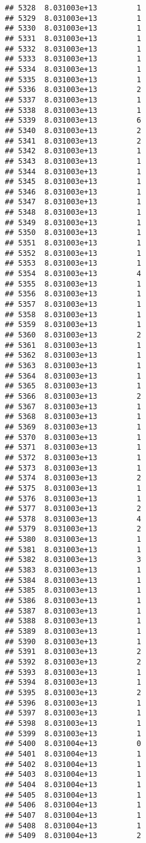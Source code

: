 \documentclass[
]{article}
\begin{document}
\begin{verbatim}
## 5328  8.031003e+13         1
## 5329  8.031003e+13         1
## 5330  8.031003e+13         1
## 5331  8.031003e+13         1
## 5332  8.031003e+13         1
## 5333  8.031003e+13         1
## 5334  8.031003e+13         1
## 5335  8.031003e+13         1
## 5336  8.031003e+13         2
## 5337  8.031003e+13         1
## 5338  8.031003e+13         1
## 5339  8.031003e+13         6
## 5340  8.031003e+13         2
## 5341  8.031003e+13         2
## 5342  8.031003e+13         1
## 5343  8.031003e+13         1
## 5344  8.031003e+13         1
## 5345  8.031003e+13         1
## 5346  8.031003e+13         1
## 5347  8.031003e+13         1
## 5348  8.031003e+13         1
## 5349  8.031003e+13         1
## 5350  8.031003e+13         1
## 5351  8.031003e+13         1
## 5352  8.031003e+13         1
## 5353  8.031003e+13         1
## 5354  8.031003e+13         4
## 5355  8.031003e+13         1
## 5356  8.031003e+13         1
## 5357  8.031003e+13         1
## 5358  8.031003e+13         1
## 5359  8.031003e+13         1
## 5360  8.031003e+13         2
## 5361  8.031003e+13         1
## 5362  8.031003e+13         1
## 5363  8.031003e+13         1
## 5364  8.031003e+13         1
## 5365  8.031003e+13         1
## 5366  8.031003e+13         2
## 5367  8.031003e+13         1
## 5368  8.031003e+13         1
## 5369  8.031003e+13         1
## 5370  8.031003e+13         1
## 5371  8.031003e+13         1
## 5372  8.031003e+13         1
## 5373  8.031003e+13         1
## 5374  8.031003e+13         2
## 5375  8.031003e+13         1
## 5376  8.031003e+13         1
## 5377  8.031003e+13         2
## 5378  8.031003e+13         4
## 5379  8.031003e+13         2
## 5380  8.031003e+13         1
## 5381  8.031003e+13         1
## 5382  8.031003e+13         3
## 5383  8.031003e+13         1
## 5384  8.031003e+13         1
## 5385  8.031003e+13         1
## 5386  8.031003e+13         1
## 5387  8.031003e+13         1
## 5388  8.031003e+13         1
## 5389  8.031003e+13         1
## 5390  8.031003e+13         1
## 5391  8.031003e+13         2
## 5392  8.031003e+13         2
## 5393  8.031003e+13         1
## 5394  8.031003e+13         1
## 5395  8.031003e+13         2
## 5396  8.031003e+13         1
## 5397  8.031003e+13         1
## 5398  8.031003e+13         1
## 5399  8.031003e+13         1
## 5400  8.031004e+13         0
## 5401  8.031004e+13         1
## 5402  8.031004e+13         1
## 5403  8.031004e+13         1
## 5404  8.031004e+13         1
## 5405  8.031004e+13         1
## 5406  8.031004e+13         1
## 5407  8.031004e+13         1
## 5408  8.031004e+13         1
## 5409  8.031004e+13         2

\end{verbatim}
\end{document}
